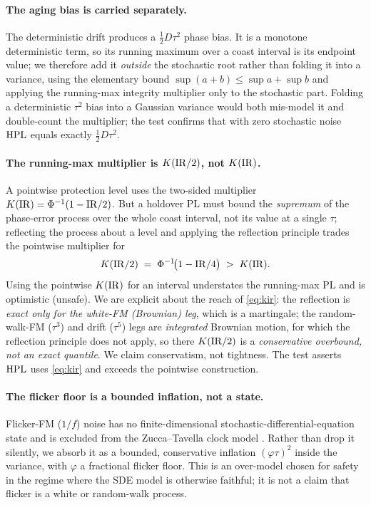 \paragraph{The aging bias is carried separately.}
The deterministic drift produces a $\tfrac12 D\tau^{2}$ phase bias. It is a
monotone deterministic term, so its running maximum over a coast interval is its
endpoint value; we therefore add it \emph{outside} the stochastic root rather than
folding it into a variance, using the elementary bound
$\sup(a+b)\le\sup a+\sup b$ and applying the running-max integrity multiplier only
to the stochastic part. Folding a deterministic $\tau^{2}$ bias into a Gaussian
variance would both mis-model it and double-count the multiplier; the test
 confirms that with
zero stochastic noise $\mathrm{HPL}$ equals exactly $\tfrac12 D\tau^{2}$.

\paragraph{The running-max multiplier is $K(\mathrm{IR}/2)$, not $K(\mathrm{IR})$.}
A pointwise protection level uses the two-sided multiplier
$K(\mathrm{IR})=\Phi^{-1}(1-\mathrm{IR}/2)$. But a holdover PL must bound the \emph{supremum} of
the phase-error process over the whole coast interval, not its value at a single
$\tau$; reflecting the process about a level and applying the reflection principle
trades the pointwise multiplier for
\begin{equation}
  K(\mathrm{IR}/2)\;=\;\Phi^{-1}\!\big(1-\mathrm{IR}/4\big)\;>\;K(\mathrm{IR}).
  \label{eq:kir}
\end{equation}
Using the pointwise $K(\mathrm{IR})$ for an interval understates the running-max PL and
is optimistic (unsafe). We are explicit about the reach of \eqref{eq:kir}: the
reflection is \emph{exact only for the white-FM (Brownian) leg}, which is a
martingale; the random-walk-FM ($\tau^{3}$) and drift ($\tau^{5}$) legs are
\emph{integrated} Brownian motion, for which the reflection principle does not
apply, so there $K(\mathrm{IR}/2)$ is a \emph{conservative overbound, not an exact
quantile}. We claim conservatism, not tightness. The test
 asserts
$\mathrm{HPL}$ uses \eqref{eq:kir} and exceeds the pointwise construction.

\paragraph{The flicker floor is a bounded inflation, not a state.}
Flicker-FM ($1/f$) noise has no finite-dimensional stochastic-differential-equation
state and is excluded from the Zucca--Tavella clock model \citep{zucca2005}. Rather
than drop it silently, we absorb it as a bounded, conservative inflation
$(\varphi\tau)^{2}$ inside the variance, with $\varphi$ a fractional flicker floor.
This is an over-model chosen for safety in the regime where the SDE model is
otherwise faithful; it is not a claim that flicker is a white or random-walk
process.

